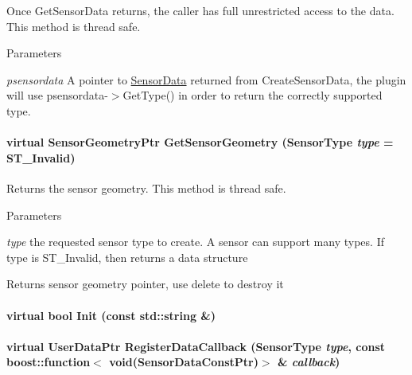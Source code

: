 Once GetSensorData returns, the caller has full unrestricted access to the data. This method is thread safe. 
\begin{DoxyParams}{Parameters}
\item[{\em psensordata}]A pointer to \hyperlink{classOpenRAVE_1_1SensorBase_1_1SensorData}{SensorData} returned from CreateSensorData, the plugin will use psensordata-\/$>$GetType() in order to return the correctly supported type. \end{DoxyParams}
\hypertarget{classOpenRAVE_1_1SensorBase_a080408b00865d76ab0890ae98207d980}{
\paragraph[{GetSensorGeometry}]{\setlength{\rightskip}{0pt plus 5cm}virtual SensorGeometryPtr GetSensorGeometry (SensorType {\em type} = {\ttfamily ST\_\-Invalid})}\hfill}
\label{classOpenRAVE_1_1SensorBase_a080408b00865d76ab0890ae98207d980}


Returns the sensor geometry. This method is thread safe. 


\begin{DoxyParams}{Parameters}
\item[{\em type}]the requested sensor type to create. A sensor can support many types. If type is ST\_\-Invalid, then returns a data structure \end{DoxyParams}
\begin{DoxyReturn}{Returns}
sensor geometry pointer, use delete to destroy it 
\end{DoxyReturn}
\hypertarget{classOpenRAVE_1_1SensorBase_a90092f801b2f4091b5509d6ea1307ce9}{
\paragraph[{Init}]{\setlength{\rightskip}{0pt plus 5cm}virtual bool Init (const std::string \&)}\hfill}
\label{classOpenRAVE_1_1SensorBase_a90092f801b2f4091b5509d6ea1307ce9}
\hypertarget{classOpenRAVE_1_1SensorBase_ab17d44ea62751790d35594754f7069e5}{
\paragraph[{RegisterDataCallback}]{\setlength{\rightskip}{0pt plus 5cm}virtual UserDataPtr RegisterDataCallback (SensorType {\em type}, \/  const boost::function$<$ void(SensorDataConstPtr)$>$ \& {\em callback})}\hfill}
\label{classOpenRAVE_1_1SensorBase_ab17d44ea62751790d35594754f7069e5}


